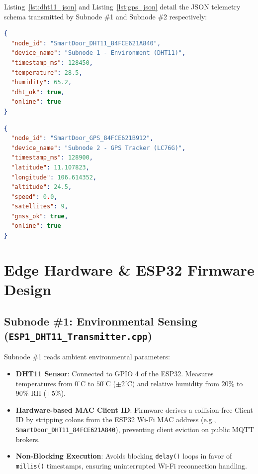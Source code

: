 \documentclass[11pt,a4paper]{article}
\begin{document}
Listing~\ref{lst:dht11_json} and Listing~\ref{lst:gps_json} detail the JSON telemetry schema transmitted by Subnode \#1 and Subnode \#2 respectively:

\begin{lstlisting}[language=json, caption={JSON telemetry schema transmitted by ESP32 Subnode \#1 (DHT11).}, label={lst:dht11_json}]
{
  "node_id": "SmartDoor_DHT11_84FCE621A840",
  "device_name": "Subnode 1 - Environment (DHT11)",
  "timestamp_ms": 128450,
  "temperature": 28.5,
  "humidity": 65.2,
  "dht_ok": true,
  "online": true
}
\end{lstlisting}

\begin{lstlisting}[language=json, caption={JSON telemetry schema transmitted by ESP32 Subnode \#2 (LC76G GNSS).}, label={lst:gps_json}]
{
  "node_id": "SmartDoor_GPS_84FCE621B912",
  "device_name": "Subnode 2 - GPS Tracker (LC76G)",
  "timestamp_ms": 128900,
  "latitude": 11.107823,
  "longitude": 106.614352,
  "altitude": 24.5,
  "speed": 0.0,
  "satellites": 9,
  "gnss_ok": true,
  "online": true
}
\end{lstlisting}

\vspace{1em}

\section{Edge Hardware \& ESP32 Firmware Design}

\subsection{Subnode \#1: Environmental Sensing (\texttt{ESP1\_DHT11\_Transmitter.cpp})}
Subnode \#1 reads ambient environmental parameters:
\begin{itemize}
    \item \textbf{DHT11 Sensor}: Connected to GPIO 4 of the ESP32. Measures temperatures from $0^\circ\text{C}$ to $50^\circ\text{C}$ ($\pm 2^\circ\text{C}$) and relative humidity from $20\%$ to $90\%$ RH ($\pm 5\%$).
    \item \textbf{Hardware-based MAC Client ID}: Firmware derives a collision-free Client ID by stripping colons from the ESP32 Wi-Fi MAC address (e.g., \texttt{SmartDoor\_DHT11\_84FCE621A840}), preventing client eviction on public MQTT brokers.
    \item \textbf{Non-Blocking Execution}: Avoids blocking \texttt{delay()} loops in favor of \texttt{millis()} timestamps, ensuring uninterrupted Wi-Fi reconnection handling.
\end{itemize}
\end{document}
